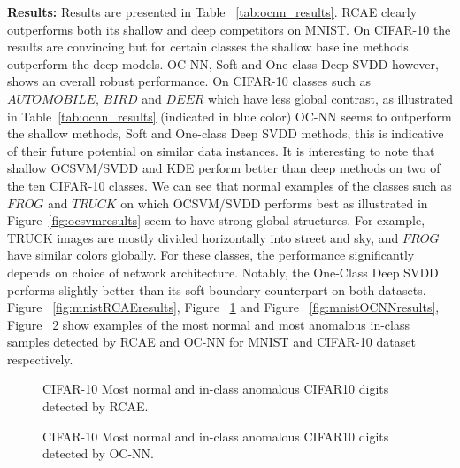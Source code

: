 {\textbf{Results:}}
Results are presented in Table ~\ref{tab:ocnn_results}. RCAE
clearly outperforms both its shallow and deep competitors
on MNIST. On CIFAR-10 the results are convincing but for certain classes the shallow baseline methods outperform the deep models. OC-NN, Soft and One-class Deep SVDD however, shows an overall robust performance. On CIFAR-10 classes such as $AUTOMOBILE$, $BIRD$ and $DEER$ which have less global contrast, as illustrated in Table~\ref{tab:ocnn_results} (indicated in blue color)  OC-NN seems to outperform the shallow methods, Soft and One-class Deep SVDD methods, this is indicative of their future potential on similar data instances.  It is interesting to note that shallow OCSVM/SVDD and KDE perform better than deep methods on two of the ten CIFAR-10 classes. We can see that normal examples of the classes  such as $FROG$ and $TRUCK$ on which OCSVM/SVDD performs best as illustrated in Figure~\ref{fig:ocsvmresults} seem to have strong global structures. For example, TRUCK images are mostly divided horizontally into street and sky, and  $FROG$ have similar colors globally. For these classes,  the performance significantly depends on choice of network architecture. Notably, the One-Class Deep SVDD performs slightly better than its soft-boundary counterpart on both datasets. Figure ~\ref{fig:mnistRCAEresults},  Figure ~\ref{fig:cifar10_rcae_results}  and Figure ~\ref{fig:mnistOCNNresults}, Figure ~\ref{fig:cifar10_ocnn_results} show examples of the most normal and most anomalous in-class samples detected by RCAE and OC-NN for MNIST and CIFAR-10 dataset respectively.


\begin{figure}[htp]
    \centering
    \hspace{1em}%
  \caption{CIFAR-10 Most normal and in-class anomalous CIFAR10 digits detected by RCAE. }
  \label{fig:cifar10_rcae_results}
\end{figure}

\begin{figure}[htp]
      \centering
      \hspace{1em}%
    \caption{CIFAR-10 Most normal and in-class anomalous CIFAR10 digits detected by OC-NN. }
    \label{fig:cifar10_ocnn_results}
\end{figure}




